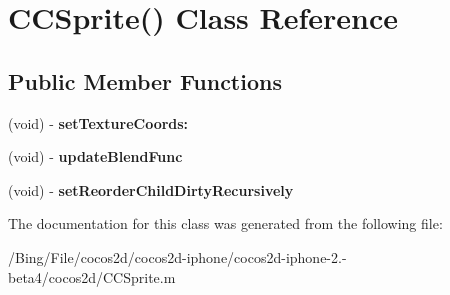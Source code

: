 \hypertarget{interface_c_c_sprite_07_08}{\section{C\-C\-Sprite() Class Reference}
\label{interface_c_c_sprite_07_08}
}
\subsection*{Public Member Functions}
\begin{DoxyCompactItemize}
\item 
\hypertarget{interface_c_c_sprite_07_08_a6407fc3e60059016f71eda1f9077f788}{(void) -\/ {\bfseries set\-Texture\-Coords\-:}}\label{interface_c_c_sprite_07_08_a6407fc3e60059016f71eda1f9077f788}

\item 
\hypertarget{interface_c_c_sprite_07_08_a9fdd8ead5274798c56c5dc9b48d66535}{(void) -\/ {\bfseries update\-Blend\-Func}}\label{interface_c_c_sprite_07_08_a9fdd8ead5274798c56c5dc9b48d66535}

\item 
\hypertarget{interface_c_c_sprite_07_08_ab94fda725c1cee7e6ce300ae4dd5bcd9}{(void) -\/ {\bfseries set\-Reorder\-Child\-Dirty\-Recursively}}\label{interface_c_c_sprite_07_08_ab94fda725c1cee7e6ce300ae4dd5bcd9}

\end{DoxyCompactItemize}


The documentation for this class was generated from the following file\-:\begin{DoxyCompactItemize}
\item 
/\-Bing/\-File/cocos2d/cocos2d-\/iphone/cocos2d-\/iphone-\/2.-\/beta4/cocos2d/C\-C\-Sprite.\-m\end{DoxyCompactItemize}
